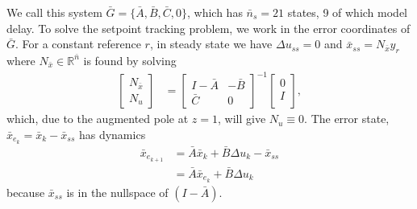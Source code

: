 \documentclass[journal,twocolumn,twoside]{IEEEtran}
\newcommand{\du}{\ensuremath{\Delta u }\xspace}
\newcommand{\Gd}{\ensuremath{\bar G }\xspace}
\newcommand{\Ad}{\ensuremath{\bar A }\xspace}
\newcommand{\Bd}{\ensuremath{\bar B }\xspace}
\newcommand{\Cd}{\ensuremath{\bar C }\xspace}
\newcommand{\xd}{\ensuremath{\bar x }\xspace}
\newcommand{\xdss}{\ensuremath{\bar x_{ss} }\xspace}
\newcommand{\y}{\ensuremath{y} \xspace}
\newcommand{\dd}{\ensuremath{\Delta }\xspace}
\begin{document}
We call this system \(\Gd = \{\Ad, \Bd, \Cd, 0\}\), which has \({\bar{n}_s=21}\) states, 9 of which model delay.
To solve the setpoint tracking problem, we work in the error
coordinates of \(\Gd\).
For a constant reference \(r\), in steady state we have \({\du_{ss}=0}\) and \(\xdss =N_{\xd}\y_r\) where \({N_{\xd}\in\mathds{R}^{\bar{n}}}\) is found by solving
\begin{align}
  \begin{bmatrix}N_{\xd} \\ N_u\end{bmatrix} &=
\begin{bmatrix}I-\Ad & -\Bd\\\Cd & 0\end{bmatrix}^{-1}\begin{bmatrix}0\\ I\\\end{bmatrix}\label{eqn:nxnu},
\end{align}
which, due to the augmented pole at $z=1$, will give \(N_u\equiv 0\). 
The error state, \({\xd_{e_k}=\xd_k - \xdss}\) has dynamics
\begin{align}
  \xd_{e_{k+1}} & = \Ad\xd_k + \Bd\dd u_k - \xdss \nonumber\\
            & = \Ad \xd_{e_k}   + \Bd \dd u_k\nonumber
\end{align}
              because $\xdss$ is in the nullspace of $(I - \Ad)$.
              
\end{document}
